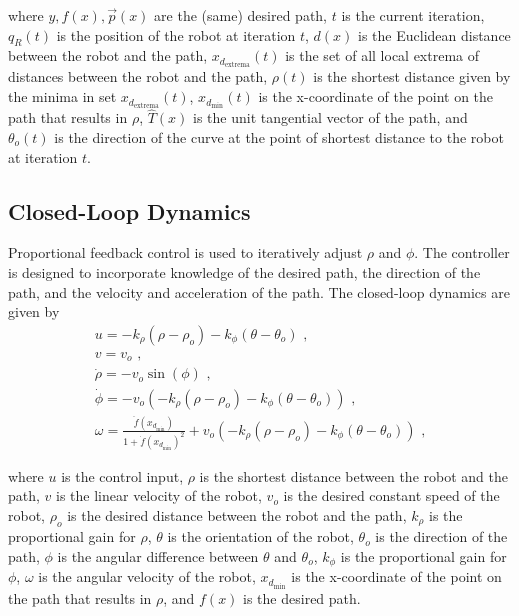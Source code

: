 \documentclass[11pt, letterpaper]{article}
\numberwithin{equation}{section}
\begin{document}
where $y, f(x), \overrightarrow{p}(x)$ are the (same) desired path, $t$ is the current iteration, $q_R(t)$ is the position of the robot at iteration $t$, $d(x)$ is the Euclidean distance between the robot and the path, $x_{d_\text{extrema}}(t)$ is the set of all local extrema of distances between the robot and the path, $\rho(t)$ is the shortest distance given by the minima in set $x_{d_\text{extrema}}(t)$, $x_{d_{\min}}(t)$ is the x-coordinate of the point on the path that results in $\rho$, $\hat{T}(x)$ is the unit tangential vector of the path, and $\theta_o(t)$ is the direction of the curve at the point of shortest distance to the robot at iteration $t$.

\subsection{Closed-Loop Dynamics}

Proportional feedback control is used to iteratively adjust $\rho$ and $\phi$. The controller is designed to incorporate knowledge of the desired path, the direction of the path, and the velocity and acceleration of the path. The closed-loop dynamics are given by
\begin{gather}
    u = -k_\rho(\rho - \rho_o) - k_\phi(\theta - \theta_o) \text{ ,} \\
    v = v_o \text{ ,} \\
    \dot{\rho} = -v_o \sin(\phi) \text{ ,} \\
    \dot{\phi} = -v_o(-k_\rho(\rho - \rho_o) - k_\phi(\theta - \theta_o)) \text{ ,} \\
    \omega = \frac{\ddot{f}(x_{d_{\min}})}{1 + \dot{f}(x_{d_{\min}})^2} + v_o (-k_\rho(\rho - \rho_o) - k_\phi(\theta - \theta_o)) \text{ ,}
\end{gather}

where $u$ is the control input, $\rho$ is the shortest distance between the robot and the path, $v$ is the linear velocity of the robot, $v_o$ is the desired constant speed of the robot, $\rho_o$ is the desired distance between the robot and the path, $k_\rho$ is the proportional gain for $\rho$, $\theta$ is the orientation of the robot, $\theta_o$ is the direction of the path, $\phi$ is the angular difference between $\theta$ and $\theta_o$, $k_\phi$ is the proportional gain for $\phi$, $\omega$ is the angular velocity of the robot, $x_{d_{\min}}$ is the x-coordinate of the point on the path that results in $\rho$, and $f(x)$ is the desired path.
\end{document}
